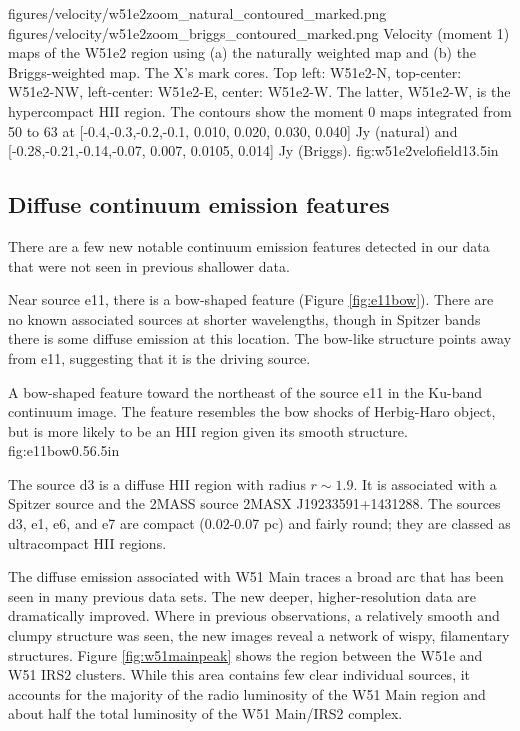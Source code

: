 \FigureTwo
{figures/velocity/w51e2zoom_natural_contoured_marked.png}
{figures/velocity/w51e2zoom_briggs_contoured_marked.png}
{Velocity (moment 1) maps of the W51e2 region using (a) the naturally weighted
map and (b) the Briggs-weighted map.  The X's mark \citet{Shi2010a} cores. Top
left: W51e2-N, top-center: W51e2-NW, left-center: W51e2-E, center: W51e2-W.
The latter, W51e2-W, is the hypercompact HII region.  The contours show the
moment 0 maps integrated from 50 to 63 \kms at [-0.4,-0.3,-0.2,-0.1, 0.010,
0.020, 0.030, 0.040] Jy \kms (natural) and [-0.28,-0.21,-0.14,-0.07, 0.007,
0.0105, 0.014] Jy \kms (Briggs).
}
{fig:w51e2velofield}{1}{3.5in}

\subsection{Diffuse continuum emission features}
\label{sec:diffuseemission}
There are a few new notable continuum emission features detected in our data
that were not seen in previous shallower data.

Near source e11, there is a bow-shaped feature (Figure \ref{fig:e11bow}).
There are no known associated sources at shorter wavelengths, though in Spitzer
bands there is some diffuse emission at this location.  The bow-like structure
points away from e11, suggesting that it is the driving source.

{A bow-shaped feature toward the northeast of the source e11 in the Ku-band
continuum image.  The feature resembles the bow shocks of Herbig-Haro object,
but is more likely to be an HII region given its smooth structure.}
{fig:e11bow}{0.5}{6.5in}

The source d3 is a diffuse HII region with radius $r\sim1.9$\arcsec.  It is
associated with a Spitzer source and the 2MASS source 2MASX J19233591+1431288.
The sources d3, e1, e6, and e7 are compact (0.02-0.07 pc) and fairly round;
they are classed as ultracompact HII regions.

The diffuse emission associated with W51 Main traces a broad arc that has been
seen in many previous data sets.  The new deeper, higher-resolution data are
dramatically improved.  Where in previous observations, a relatively smooth and
clumpy structure was seen, the new images reveal a network of wispy,
filamentary structures.  Figure \ref{fig:w51mainpeak} shows the region between
the W51e and W51 IRS2 clusters.  While this area contains few clear individual
sources, it accounts for the majority of the radio luminosity of the W51 Main
region and about half the total luminosity of the W51 Main/IRS2 complex.

